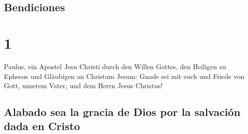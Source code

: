 \hypertarget{bendiciones}{%
\subsection{Bendiciones}\label{bendiciones}}

\hypertarget{section}{%
\section{1}\label{section}}

 Paulus, ein Apostel Jesu Christi durch den Willen Gottes,
den Heiligen zu Ephesus und Gläubigen an Christum Jesum: 
Gnade sei mit euch und Friede von Gott, unserem Vater, und dem Herrn
Jesus Christus!

\hypertarget{alabado-sea-la-gracia-de-dios-por-la-salvaciuxf3n-dada-en-cristo}{%
\subsection{Alabado sea la gracia de Dios por la salvación dada en
Cristo}\label{alabado-sea-la-gracia-de-dios-por-la-salvaciuxf3n-dada-en-cristo}}

